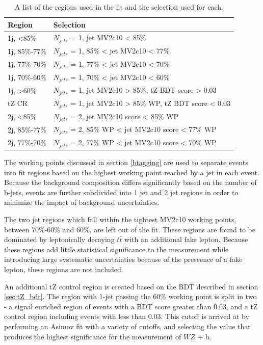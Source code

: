 \documentclass[NOTE, atlasdraft=true, texlive=2016, UKenglish]{\ATLASLATEXPATH atlasdoc}
\begin{document}
\begin{table}[h]
\centering
\caption{A list of the regions used in the fit and the selection used for each.}
\begin{tabular}{l|l}
\hline\hline
Region & Selection  	      \\
\hline
\hline
1j, <85\%	& $N_{jets}$ = 1, jet MV2c10 < 85\%		      \\
1j, 85\%-77\%	& $N_{jets}$ = 1, 85\% < jet MV2c10 < 77\% 		      \\
1j, 77\%-70\%	& $N_{jets}$ = 1, 77\% < jet MV2c10 < 70\% 		      \\
1j, 70\%-60\%	& $N_{jets}$ = 1, 70\% < jet MV2c10 < 60\% 		      \\
1j, >60\%	& $N_{jets}$ = 1, jet MV2c10 > 85\%, tZ BDT score > 0.03 \\
tZ CR	& $N_{jets}$ = 1, jet MV2c10 > 85\% WP, tZ BDT score < 0.03 \\
2j, <85\%	& $N_{jets}$ = 2, jet MV2c10 score < 85\% WP		      \\
2j, 85\%-77\%	& $N_{jets}$ = 2, 85\% WP < jet MV2c10 score < 77\% WP		      \\
2j, 77\%-70\%	& $N_{jets}$ = 2, 77\% WP < jet MV2c10 score < 70\% WP		      \\
\hline\hline
\end{tabular}
\label{tab:regions}
\end{table}

The working points discussed in section \ref{btagging} are used to separate events into fit regions based on the highest working point reached by a jet in each event. Because the background composition differs significantly based on the number of b-jets, events are further subdivided into 1 jet and 2 jet regions in order to minimize the impact of background uncertainties. 

The two jet regions which fall within the tightest MV2c10 working points, between 70\%-60\% and 60\%, are left out of the fit. These regions are found to be dominated by leptonically decaying $t\bar{t}$ with an additional fake lepton. Because these regions add little statistical significance to the measurement while introducing large systematic uncertainties because of the prescence of a fake lepton, these regions are not included.

An additional tZ control region is created based on the BDT described in section \ref{sec:tZ_bdt}. The region with 1-jet passing the 60\% working point is split in two - a signal enriched region of events with a BDT score greater than 0.03, and a tZ control region including events with less than 0.03. This cutoff is arrived at by performing an Asimov fit with a variety of cutoffs, and selecting the value that produces the highest significance for the measurement of $WZ$ + b. 
\end{document}
